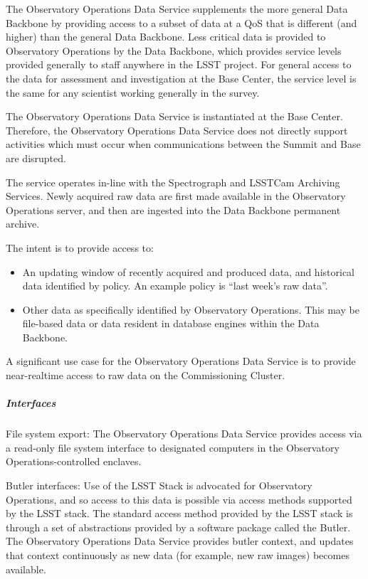 The Observatory Operations Data Service supplements the more general Data
Backbone by providing access to a subset of data at a QoS that is
different (and higher) than the general Data Backbone.  Less critical
data is provided to Observatory Operations by the Data Backbone, which
provides service levels provided generally to staff anywhere in the
LSST project. For general access to the data for assessment and
investigation at the Base Center, the service level is the same for any
scientist working generally in the survey.

The Observatory Operations Data Service is instantiated at the Base
Center. Therefore, the Observatory Operations Data Service does not
directly support activities which must occur when communications
between the Summit and Base are disrupted.

The service operates in-line with the Spectrograph and LSSTCam Archiving
Services. Newly acquired raw data are first made available in the Observatory
Operations server, and then are ingested into the Data Backbone permanent archive.

The intent is to provide access to:

\begin{itemize}

\item An updating window of recently acquired and produced data, and
historical data identified by policy. An example policy is ``last week’s raw data''.

\item Other data as specifically identified  by Observatory Operations.
This may be file-based data or data resident in database engines within
the Data Backbone.

\end{itemize}

A significant use case for the Observatory Operations Data Service is to
provide near-realtime access to raw data on the Commissioning Cluster.

\subparagraph{Interfaces}

File system export: The Observatory Operations Data Service provides access
via a read-only file system interface to designated computers in the
Observatory Operations-controlled enclaves.

Butler interfaces: Use of the LSST Stack is advocated for Observatory Operations,
and so access to this data is possible via access methods supported by the LSST stack.
The standard access method provided by the LSST stack is through a set of
abstractions provided by a software package called the Butler. The Observatory
Operations Data Service provides butler context, and updates that context continuously
as new data (for example, new raw images) becomes available.

